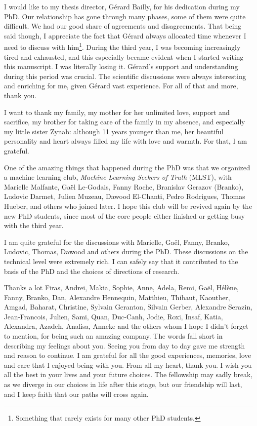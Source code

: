 \par I would like to my thesis director, G\'erard Bailly, for his dedication during my PhD. Our relationship has gone through many phases, some of them were quite difficult. We had our good share of agreements and disagreements. That being said though, I appreciate the fact that G\'erard always allocated time whenever I need to discuss with him\footnote{Something that rarely exists for many other PhD students.}. During the third year, I was becoming increasingly tired and exhausted, and this especially became evident when I started writing this manuscript. I was literally losing it. G\'erard's support and understanding during this period was crucial. The scientific discussions were always interesting and enriching for me, given G\'erard vast experience. For all of that and more, thank you.

\par I want to thank my family, my mother for her unlimited love, support and sacrifice, my brother for taking care of the family in my absence, and especially my little sister Zynab: although 11 years younger than me, her beautiful personality and heart always filled my life with love and warmth. For that, I am grateful.

\par One of the amazing things that happened during the PhD was that we organized a machine learning club, \textit{Machine Learning Seekers of Truth} (MLST), with Marielle Malfante, Ga\"{e}l Le-Godais, Fanny Roche, Branislav Gerazov (Branko), Ludovic Darmet, Julien Muzeau, Dawood El-Chanti, Pedro Rodrigues, Thomas Hueber, and others who joined later. I hope this club will be revived again by the new PhD students, since most of the core people either finished or getting busy with the third year.

\par I am quite grateful for the discussions with Marielle, Ga\"{e}l, Fanny, Branko, Ludovic, Thomas, Dawood and others during the PhD. These discussions on the technical level were extremely rich. I can safely say that it contributed to the basis of the PhD and the choices of directions of research.

\par Thanks a lot Firas, Andrei, Makia, Sophie, Anne, Adela, Remi, Ga\"{e}l, H\'el\`ene, Fanny, Branko, Dan, Alexandre Hennequin, Matthieu, Thibaut, Kaouther, Amgad, Baharat, Christine, Sylvain Geranton, Silvain Gerber, Alexandre Serazin, Jean-Francois, Julien, Sami, Quan, Duc-Canh, Jodie, Roxi, Insaf, Katia, Alexandra, Azadeh, Analisa, Anneke and the others whom I hope I didn't forget to mention, for being such an amazing company. The words fall short in describing my feelings about you. Seeing you from day to day gave me strength and reason to continue. I am grateful for all the good experiences, memories, love and care that I enjoyed being with you. From all my heart, thank you. I wish you all the best in your lives and your future choices. The fellowship may sadly break, as we diverge in our choices in life after this stage, but our friendship will last, and I keep faith that our paths will cross again.

